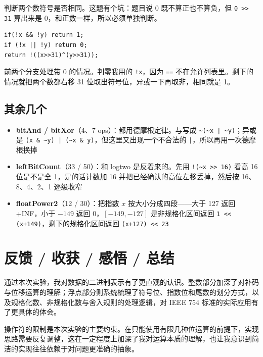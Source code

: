 \documentclass[11pt, a4paper]{ctexart}
\begin{document}
判断两个数符号是否相同。这题有个坑：题目说 0 既不算正也不算负，但 \texttt{0 >> 31} 算出来是 0，和正数一样，所以必须单独判断。

\begin{lstlisting}[style=c]
if(!x && !y) return 1;
if (!x || !y) return 0;
return !((x>>31)^(y>>31));
\end{lstlisting}

前两个分支处理带 0 的情况。判零我用的 \texttt{!x}，因为 \texttt{==} 不在允许列表里。剩下的情况就把两个数都右移 31 位取出符号位，异或一下再取非，相同就是 1。

\subsection{其余几个}

\begin{itemize}[itemsep=0.3em]
    \item \textbf{bitAnd / bitXor}（4、7 ops）：都用德摩根定律。与写成 \texttt{\textasciitilde(\textasciitilde x | \textasciitilde y)}；异或是 \texttt{(x \& \textasciitilde y) | (\textasciitilde x \& y)}，但这里又出现一个不合法的 \texttt{|}，所以再用一次德摩根换掉
    \item \textbf{leftBitCount}（33 / 50）：和 logtwo 是反着来的。先用 \texttt{!(\textasciitilde x >> 16)} 看高 16 位是不是全 1，是的话计数加 16 并把已经确认的高位左移丢掉，然后按 16、8、4、2、1 逐级收窄
    \item \textbf{floatPower2}（12 / 30）：把指数 $x$ 按大小分成四段——大于 127 返回 +INF，小于 $-149$ 返回 0，$[-149,-127]$ 是非规格化区间返回 \texttt{1 << (x+149)}，剩下的规格化区间返回 \texttt{(x+127) << 23}
\end{itemize}

\section{反馈 / 收获 / 感悟 / 总结}

通过本次实验，我对数据的二进制表示有了更直观的认识。整数部分加深了对补码与位移运算的理解；浮点部分则系统梳理了符号位、指数位和尾数的划分方式，以及规格化数、非规格化数与舍入规则的处理逻辑，对 IEEE 754 标准的实际应用有了更具体的体会。

操作符的限制是本次实验的主要约束。在只能使用有限几种位运算的前提下，实现思路需要反复调整，这在一定程度上加深了我对运算本质的理解，也让我意识到简洁的实现往往依赖于对问题更准确的抽象。
\end{document}
